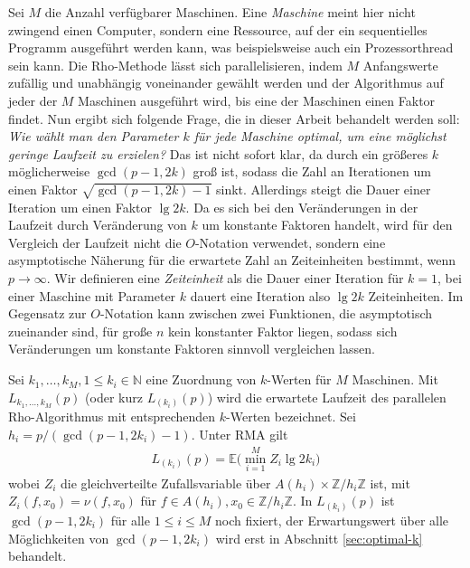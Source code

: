 \documentclass[a4paper, 11pt, ngerman]{article}
\newcommand{\E}{\mathbb{E}}
\newcommand{\N}{\mathbb{N}}
\newcommand{\Z}{\mathbb{Z}}
\theoremstyle{definition}
\theoremstyle{plain}
\theoremstyle{remark}
\begin{document}
Sei $M$ die Anzahl verfügbarer Maschinen. Eine \emph{Maschine} meint hier nicht zwingend einen Computer, sondern eine Ressource, auf der ein sequentielles Programm ausgeführt werden kann, was beispielsweise auch ein Prozessorthread sein kann. Die Rho-Methode lässt sich parallelisieren, indem $M$ Anfangswerte zufällig und unabhängig voneinander gewählt werden und der Algorithmus auf jeder der $M$ Maschinen ausgeführt wird, bis eine der Maschinen einen Faktor findet. Nun ergibt sich folgende Frage, die in dieser Arbeit behandelt werden soll: \emph{Wie wählt man den Parameter $k$ für jede Maschine optimal, um eine möglichst geringe Laufzeit zu erzielen?} Das ist nicht sofort klar, da durch ein größeres $k$ möglicherweise $\gcd(p - 1, 2k)$ groß ist, sodass die Zahl an Iterationen um einen Faktor $\sqrt{\gcd(p - 1, 2k) -1}$ sinkt. Allerdings steigt die Dauer einer Iteration um einen Faktor $\lg 2k$. Da es sich bei den Veränderungen in der Laufzeit durch Veränderung von $k$ um konstante Faktoren handelt, wird für den Vergleich der Laufzeit nicht die $O$-Notation verwendet, sondern eine asymptotische Näherung für die erwartete Zahl an Zeiteinheiten bestimmt, wenn $p \to \infty$. Wir definieren eine \emph{Zeiteinheit} als die Dauer einer Iteration für $k = 1$, bei einer Maschine mit Parameter $k$ dauert eine Iteration also $\lg 2k$ Zeiteinheiten. Im Gegensatz zur $O$-Notation kann zwischen zwei Funktionen, die asymptotisch zueinander sind, für große $n$ kein konstanter Faktor liegen, sodass sich Veränderungen um konstante Faktoren sinnvoll vergleichen lassen.

Sei $k_1, \dots, k_M, 1 \le k_i \in \N$ eine Zuordnung von $k$-Werten für $M$ Maschinen. Mit $L_{k_1, \dots, k_M}(p)$ (oder kurz $L_{(k_i)}(p)$) wird die erwartete Laufzeit des parallelen Rho-Algorithmus mit entsprechenden $k$-Werten bezeichnet. Sei $h_i = p/(\gcd(p - 1, 2k_i) - 1)$. Unter RMA gilt
\begin{align}
    L_{(k_i)}(p) = \E \bigg ( \min_{i = 1}^M Z_i \lg 2k_i \bigg )
    \label{eq:lki-definition}
\end{align}
wobei $Z_i$ die gleichverteilte Zufallsvariable über $A(h_i) \times \Z/h_i\Z$ ist, mit $Z_i(f, x_0) = \nu(f, x_0)$ für $f \in A(h_i), x_0 \in \Z/h_i\Z$. In $L_{(k_i)}(p)$ ist $\gcd(p - 1, 2k_i)$ für alle $1 \le i \le M$ noch fixiert, der Erwartungswert über alle Möglichkeiten von $\gcd(p - 1, 2k_i)$ wird erst in Abschnitt \ref{sec:optimal-k} behandelt.
\end{document}
